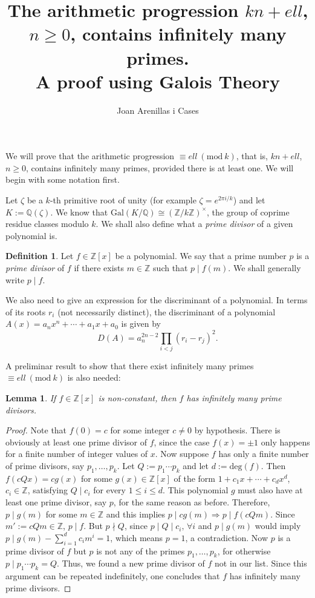 \documentclass[a4paper, 12pt]{article}
\title{\textbf{The arithmetic progression ${k}n+{ell}$, $n\geqslant0$, contains infinitely many primes.\\ A proof using Galois Theory}}
\author[1]{Joan Arenillas i Cases}
\newtheorem{lemma}[theorem]{Lemma}
\theoremstyle{definition}
\newtheorem{definition}[theorem]{Definition}
\theoremstyle{remark}
\newcommand{\Z}{\ensuremath{\mathbb{Z}}}
\newcommand{\Q}{\ensuremath{\mathbb{Q}}}
\newcommand{\Mod}[1]{\ (\mathrm{mod}\ #1)} %
\begin{document}
\maketitle
\sloppy
We will prove that the arithmetic progression $\equiv {ell} \Mod{{k}}$, that is, ${k}n+{ell}$, $n\geqslant0$, contains infinitely many primes, provided there is at least one. We will begin with some notation first.

Let $\zeta$ be a ${k}$-th primitive root of unity (for example $\zeta=e^{2\pi i/{{k}}}$) and let $K:=\Q(\zeta)$. We know that $\text{Gal}(K/\Q)\cong (\Z/{k}\Z)^\times$, the group of coprime residue classes modulo ${k}$. We shall also define what a \emph{prime divisor} of a given polynomial is. 
\begin{definition}
Let $f\in\Z[x]$ be a polynomial. We say that a prime number $p$ is a \emph{prime divisor} of $f$ if there exists $m\in\Z$ such that $p\mid f(m)$. We shall generally write $p\mid f$.
\end{definition}

We also need to give an expression for the discriminant of a polynomial. In terms of its roots $r_i$ (not necessarily distinct), the discriminant of a polynomial $A(x)=a_nx^n+\cdots+a_1x+a_0$ is given by
	\begin{equation}\label{discrim}
		D(A)=a_n^{2n-2}\prod_{i<j}(r_i-r_j)^2.
	\end{equation}

A preliminar result to show that there exist infinitely many primes $\equiv {ell}\Mod{{k}}$ is also needed:

\begin{lemma}\label{ThSchur}
If $f\in\Z[x]$ is non-constant, then $f$ has infinitely many prime divisors.
\end{lemma}
\begin{proof}
Note that $f(0)=c$ for some integer $c\neq 0$ by hypothesis. There is obviously at least one prime divisor of $f$, since the case $f(x)=\pm 1$ only happens for a finite number of integer values of $x$. Now suppose $f$ has only a finite number of prime divisors, say $p_1,\dots,p_k$. Let $Q:=p_1\cdots p_k$ and let $d:=\text{deg}(f)$. Then $f(cQx)=cg(x)$ for some $g(x)\in\Z[x]$ of the form $1+c_1x+\cdots+c_{d}x^{d}$, $c_i\in\Z$, satisfying $Q\mid c_i$ for every $1\leqslant i \leqslant d$. This polynomial $g$ must also have at least one prime divisor, say $p$, for the same reason as before. Therefore, $p\mid g(m)$ for some $m\in\Z$ and this implies $p\mid cg(m)\Rightarrow p\mid f(cQm)$. Since $m':=cQm\in\Z$, $p\mid f$. But $p\nmid Q$, since $p\mid Q\mid c_i, \,\forall i$ and $p\mid g(m)$ would imply $p\mid g(m) - \sum_{i=1}^{d}c_im^i=1$, which means $p=1$, a contradiction. Now $p$ is a prime divisor of $f$ but $p$ is not any of the primes $p_1,\dots,p_k$, for otherwise $p\mid p_1\cdots p_k=Q$. Thus, we found a new prime divisor of $f$ not in our list. Since this argument can be repeated indefinitely, one concludes that $f$ has infinitely many prime divisors.
\end{proof}
\end{document}
